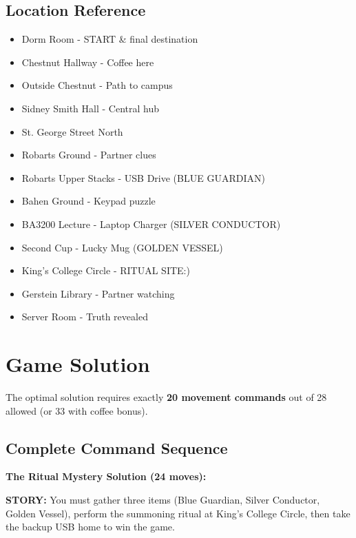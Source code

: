 \documentclass[12pt]{article}
\begin{document}
\subsection{Location Reference}

\begin{itemize}[leftmargin=2cm]
\item[\textbf{[0]}] Dorm Room - START \& final destination
\item[\textbf{[1]}] Chestnut Hallway - Coffee here
\item[\textbf{[2]}] Outside Chestnut - Path to campus
\item[\textbf{[3]}] Sidney Smith Hall - Central hub
\item[\textbf{[4]}] St. George Street North
\item[\textbf{[5]}] Robarts Ground - Partner clues
\item[\textbf{[6]}] Robarts Upper Stacks - USB Drive (BLUE GUARDIAN)
\item[\textbf{[7]}] Bahen Ground - Keypad puzzle
\item[\textbf{[8]}] BA3200 Lecture - Laptop Charger (SILVER CONDUCTOR)
\item[\textbf{[9]}] Second Cup - Lucky Mug (GOLDEN VESSEL)
\item[\textbf{[10]}] King's College Circle - RITUAL SITE:)
\item[\textbf{[11]}] Gerstein Library - Partner watching
\item[\textbf{[12]}] Server Room - Truth revealed
\end{itemize}

\section{Game Solution}

The optimal solution requires exactly \textbf{20 movement commands} out of 28 allowed (or 33 with coffee bonus).

\subsection{Complete Command Sequence}

\textbf{The Ritual Mystery Solution (24 moves):}

\textbf{STORY:} You must gather three items (Blue Guardian, Silver Conductor, Golden Vessel), perform the summoning ritual at King's College Circle, then take the backup USB home to win the game.
\end{document}
